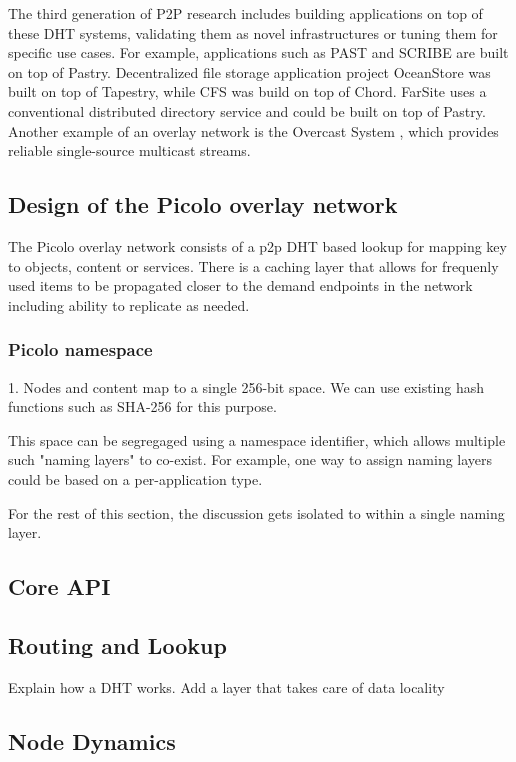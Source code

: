 The third generation of P2P research includes building applications on top of these DHT systems, validating them as
novel infrastructures or tuning them for specific use cases. For example, applications such as PAST \cite{past} and
SCRIBE \cite{scribe} are built on top of Pastry. Decentralized file storage application project OceanStore \cite{oceanstore} was built
on top of Tapestry, while CFS \cite{cfs} was build on top of Chord. FarSite \cite{farsite} uses a conventional
distributed directory service and could be built on top of Pastry. Another example of an overlay network is the Overcast
System \cite{overcast}, which provides reliable single-source multicast streams.

\subsection{Design of the Picolo overlay network}

The Picolo overlay network consists of a p2p DHT based lookup for mapping key to objects, content or services. There is a caching layer that allows for frequenly used items to be propagated closer to the demand endpoints in the network including ability to replicate as needed.

\subsubsection{Picolo namespace} 
1. Nodes and content map to a single 256-bit space. We can use existing hash functions such as SHA-256 for this purpose.

This space can be segregaged using a namespace identifier, which allows multiple such "naming layers" to co-exist. For example, one way to assign naming layers could be based on a per-application type.

For the rest of this section, the discussion gets isolated to within a single naming layer.

\subsection{Core API}

\subsection{Routing and Lookup}
Explain how a DHT works. Add a layer that takes care of data locality

\subsection{Node Dynamics}

